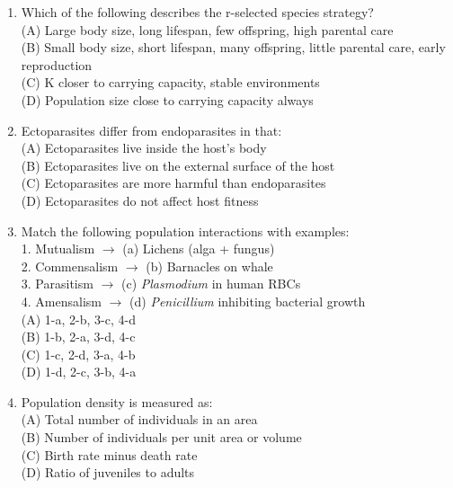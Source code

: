 \documentclass{article}
\begin{document}
\begin{enumerate}[label=Q\arabic*.]
\item Which of the following describes the r-selected species strategy?
\\(A) Large body size, long lifespan, few offspring, high parental care
\\(B) Small body size, short lifespan, many offspring, little parental care, early reproduction
\\(C) K closer to carrying capacity, stable environments
\\(D) Population size close to carrying capacity always

\item Ectoparasites differ from endoparasites in that:
\\(A) Ectoparasites live inside the host's body
\\(B) Ectoparasites live on the external surface of the host
\\(C) Ectoparasites are more harmful than endoparasites
\\(D) Ectoparasites do not affect host fitness

\item Match the following population interactions with examples:\\
1. Mutualism $\rightarrow$ (a) Lichens (alga + fungus)\\
2. Commensalism $\rightarrow$ (b) Barnacles on whale\\
3. Parasitism $\rightarrow$ (c) \textit{Plasmodium} in human RBCs\\
4. Amensalism $\rightarrow$ (d) \textit{Penicillium} inhibiting bacterial growth
\\(A) 1-a, 2-b, 3-c, 4-d
\\(B) 1-b, 2-a, 3-d, 4-c
\\(C) 1-c, 2-d, 3-a, 4-b
\\(D) 1-d, 2-c, 3-b, 4-a

\item Population density is measured as:
\\(A) Total number of individuals in an area
\\(B) Number of individuals per unit area or volume
\\(C) Birth rate minus death rate
\\(D) Ratio of juveniles to adults

\end{enumerate}
\end{document}
